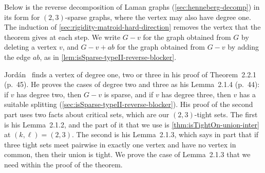 Below is the reverse decomposition of Laman graphs
(\cref{sec:henneberg-decomp}) in its form for $(2,3)$-sparse graphs,
where the vertex may also have degree one. The induction of
\cref{sec:rigidity-matroid-hard-direction} removes the vertex that the
theorem gives at each step. We write $G - v$ for the graph obtained
from $G$ by deleting a vertex $v$, and $G - v + ab$ for the graph
obtained from $G - v$ by adding the edge $ab$, as in
\cref{lem:isSparse-typeII-reverse-blocker}.

Jord\'an~\cite{jordan2016} finds a vertex of degree one, two or three
in his proof of Theorem~2.2.1 (p.~45). He proves the cases of degree
two and three as his Lemma~2.1.4 (p.~44): if $v$ has degree two, then
$G - v$ is sparse, and if $v$ has degree three, then $v$ has a
suitable splitting (\cref{sec:isSparse-typeII-reverse-blocker}). His
proof of the second part uses two facts about critical sets, which are
our $(2,3)$-tight sets. The first is his Lemma~2.1.2, and the part of
it that we use is \cref{thm:isTightOn-union-inter} at
$(k,\ell) = (2,3)$. The second is his Lemma~2.1.3, which says in part
that if three tight sets meet pairwise in exactly one vertex and have
no vertex in common, then their union is tight. We prove the case of
Lemma~2.1.3 that we need within the proof of the theorem.

